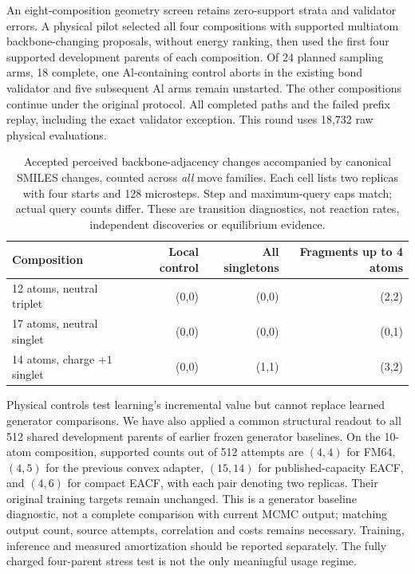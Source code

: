 An eight-composition geometry screen retains zero-support strata and validator
errors. A physical pilot selected all four compositions with supported multiatom
backbone-changing proposals, without energy ranking, then used the first four
supported development parents of each composition. Of 24 planned sampling arms,
18 complete, one Al-containing control aborts in the existing bond validator and
five subsequent Al arms remain unstarted. The other compositions continue under
the original protocol. All completed paths and the failed prefix replay, including
the exact validator exception. This round uses 18,732 raw physical evaluations.

\begin{table}[t]
\centering\small
\caption{Accepted perceived backbone-adjacency changes accompanied by canonical
SMILES changes, counted across \emph{all} move families. Each cell lists two
replicas with four starts and 128 microsteps. Step and maximum-query caps match;
actual query counts differ. These are transition diagnostics, not reaction rates,
independent discoveries or equilibrium evidence.}
\label{tab:fragment-physical}
\begin{tabular}{lrrr}
\toprule
Composition & Local control & All singletons & Fragments up to 4 atoms\\
\midrule
12 atoms, neutral triplet & (0,0) & (0,0) & (2,2)\\
17 atoms, neutral singlet & (0,0) & (0,0) & (0,1)\\
14 atoms, charge $+1$ singlet & (0,0) & (1,1) & (3,2)\\
\bottomrule
\end{tabular}
\end{table}

Physical controls test learning's incremental value but cannot replace learned
generator comparisons. We have also applied a common structural readout to all
512 shared development parents of earlier frozen generator baselines. On the
10-atom composition, supported counts out of 512 attempts are $(4,4)$ for FM64,
$(4,5)$ for the previous convex adapter, $(15,14)$ for published-capacity EACF,
and $(4,6)$ for compact EACF, with each pair denoting two replicas. Their original
training targets remain unchanged. This is a generator
baseline diagnostic, not a complete comparison with current MCMC output; matching
output count, source attempts, correlation and costs remains necessary. Training,
inference and measured amortization should be reported separately. The fully
charged four-parent stress test is not the only meaningful usage regime.

